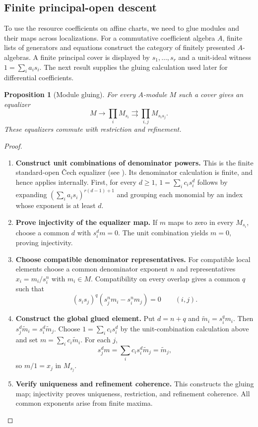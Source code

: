 \documentclass[11pt,a4paper]{article}
\numberwithin{algorithm}{section}
\numberwithin{equation}{section}
\newtheorem{proposition}[proposition]{Proposition}
\theoremstyle{definition}
\theoremstyle{remark}
\theoremstyle{plain}
\theoremstyle{definition}
\theoremstyle{plain}
\begin{document}
\subsection{Finite principal-open descent}
To use the resource coefficients on affine charts, we need to glue
modules and their maps across localizations. For a commutative
coefficient algebra $A$, finite lists of generators and equations
construct the category of finitely presented $A$-algebras.
A finite principal cover is displayed by $s_1,\ldots,s_r$ and a
unit-ideal witness $1=\sum_i a_i s_i$. The next result supplies
the gluing calculation used later for differential coefficients.
\begin{proposition}[Module gluing]\label{prop:descent}
For every $A$-module $M$ such a cover gives an equalizer
\[
 M\longrightarrow\prod_i M_{s_i}
 \rightrightarrows\prod_{i,j}M_{s_is_j}.
\]
These equalizers commute with restriction and refinement.
\end{proposition}
\begin{proof}\leavevmode
\begin{enumerate}[leftmargin=*,align=left]
\item \textbf{Construct unit combinations of denominator powers.}
This is the finite standard-open \v{C}ech equalizer
(see \citep[Tag~01X9]{Stacks}). Its denominator calculation
is finite, and hence applies internally. First, for every $d\ge1$,
$1=\sum_i c_i s_i^d$ follows by expanding
$(\sum_i a_i s_i)^{r(d-1)+1}$ and grouping each monomial by
an index whose exponent is at least $d$.

\item \textbf{Prove injectivity of the equalizer map.}
If $m$ maps to zero in
every $M_{s_i}$, choose a common $d$ with $s_i^d m=0$.
The unit combination yields $m=0$, proving injectivity.

\item \textbf{Choose compatible denominator representatives.}
For compatible local elements choose a common denominator exponent
$n$ and representatives $x_i=m_i/s_i^n$ with $m_i\in M$.
Compatibility on every overlap gives a common $q$ such that
\[
 (s_is_j)^q(s_j^n m_i-s_i^n m_j)=0\qquad(i,j).
\]

\item \textbf{Construct the global glued element.}
Put $d=n+q$ and $\widetilde m_i=s_i^q m_i$. Then
$s_j^d\widetilde m_i=s_i^d\widetilde m_j$. Choose
$1=\sum_i c_i s_i^d$ by the unit-combination calculation above and set
$m=\sum_i c_i\widetilde m_i$. For each $j$,
\[
 s_j^d m=\sum_i c_i s_i^d\widetilde m_j=\widetilde m_j,
\]
so $m/1=x_j$ in $M_{s_j}$.

\item \textbf{Verify uniqueness and refinement coherence.}
This constructs the gluing map;
injectivity proves uniqueness, restriction, and refinement
coherence. All common exponents arise from finite maxima.
\end{enumerate}
\end{proof}
\end{document}
